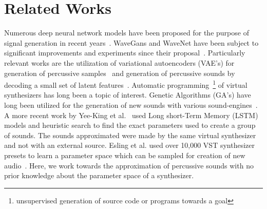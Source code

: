 \documentclass[runningheads,a4paper]{llncs}
\begin{document}
\section{Related Works}
Numerous deep neural network models have been proposed for the purpose of signal generation in recent years~\cite{nsynth2017,yamamoto2020parallel,oord2017parallel,yee2018automatic,ramires2020neural}. WaveGans and WaveNet have been subject to significant improvements and experiments since their proposal~\cite{nsynth2017,yamamoto2020parallel,oord2017parallel}. Particularly relevant works are the utilization of variational autoencoders (VAE's) for generation of percussive samples~\cite{aouameur2019neural} and generation of percussive sounds by decoding a small set of latent features~\cite{ramires2020neural}. Automatic programming~\footnote{unsupervised generation of source code or programs towards a goal} of virtual synthesizers has long been a topic of interest. Genetic Algorithms (GA's) have long been utilized for the generation of new sounds with various sound-engines~\cite{hornermachinetongues,macret2012automatic}. A more recent work by Yee-King et al.~\cite{yee2018automatic} used Long short-Term Memory (LSTM) models and heuristic search to find the exact parameters used to create a group of sounds. The sounds approximated were made by the same virtual synthesizer and not with an external source. Esling et al. used  over 10,000 VST synthesizer presets to learn a parameter space which can be sampled for creation of new audio~\cite{esling2019universal}. Here, we work towards the approximation of percussive sounds with no prior knowledge about the parameter space of a synthesizer.
\end{document}
